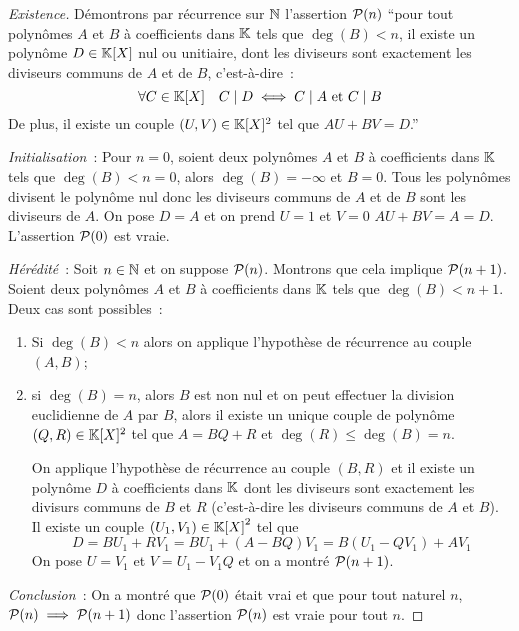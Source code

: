 \begin{proof}[Existence]
  Démontrons par récurrence sur \(\N\) l'assertion \(\P(n)\) ``pour tout
  polynômes \(A\) et \(B\) à coefficients dans \(\K\) tels que \(\deg(B)<n\), il
  existe un polynôme \(D \in \K[X]\)  nul ou unitiaire, dont les diviseurs sont
  exactement les diviseurs communs de \(A\) et de \(B\), c'est-à-dire~:
  \begin{equation}
    \forall C \in \K[X] \quad C\mid{}D \iff C\mid{}A \text{~et~} C\mid{}B
  \end{equation}
  De plus, il existe un couple \((U,V) \in \K[X]^2\) tel que \(AU+BV = D\).''

  \emph{Initialisation}~: Pour \(n = 0\), soient deux polynômes \(A\) et \(B\) à
  coefficients dans \(\K\) tels que \(\deg(B)<n = 0\), alors \(\deg(B) = -\infty\)
  et \(B = 0\). Tous les polynômes divisent le polynôme nul donc les diviseurs
  communs de \(A\) et de \(B\) sont les diviseurs de \(A\). On pose \(D = A\) et
  on prend \(U = 1\) et \(V = 0\) \(AU + BV = A = D\). L'assertion \(\P(0)\) est vraie.

  \emph{Hérédité}~: Soit \(n \in \N\) et on suppose \(\P(n)\). Montrons que cela
  implique \(\P(n+1)\). Soient deux polynômes \(A\) et \(B\) à coefficients dans
  \(\K\) tels que \(\deg(B)<n+1\). Deux cas sont possibles~:
  \begin{enumerate}
    \item Si \(\deg(B)<n\) alors on applique l'hypothèse de récurrence au
      couple \((A,B)\);
    \item si \(\deg(B) = n\), alors \(B\) est non nul et on peut effectuer la
      division euclidienne de \(A\) par \(B\), alors il existe un unique couple
      de polynôme \((Q,R) \in \K[X]^2\) tel que \(A = BQ+R\) et
      \(\deg(R)\leqslant\deg(B) = n\).

      On applique l'hypothèse de récurrence au couple \((B,R)\) et il existe un
      polynôme \(D\) à coefficients dans \(\K\) dont les diviseurs sont
      exactement les divisurs communs de \(B\) et \(R\) (c'est-à-dire les
      diviseurs communs de \(A\) et \(B\)). Il existe un couple \((U_1,V_1) \in
      {\K[X]}^2\) tel que
      \begin{equation}
        D = BU_1+RV_1 = BU_1+(A-BQ)V_1 = B(U_1-QV_1)+AV_1
      \end{equation}
      On pose \(U = V_1\) et \(V = U_1-V_1Q\) et on a montré \(\P(n+1)\).
  \end{enumerate}

  \emph{Conclusion}~: On a montré que \(\P(0)\) était vrai et que pour tout
  naturel \(n\), \(\P(n)\implies\P(n+1)\) donc l'assertion \(\P(n)\) est vraie
  pour tout \(n\).


\end{proof}
